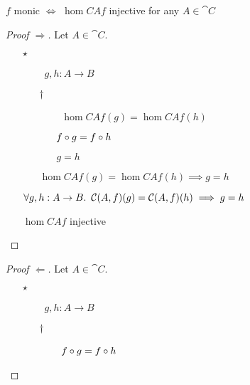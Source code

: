\begin{prop}
  $f$ monic $\iff$ $\hom{C}{A}{f}$ injective for any $A\in\cat{C}$

  \begin{proof}[Proof $\Rightarrow$]
    Let $A\in\cat{C}$.
    \begin{itemize}
      \item[$\star$]
        \begin{itemize}
          \item[\phs] \Let~$g, h : A\to B$
            \marginnote{\Hyp}

          \item[$\dagger$]
            \begin{itemize}
            \item[\phs] \Ass~$\hom{C}{A}{f}(g) = \hom{C}{A}{f}(h)$
              \marginnote{\Hyp}

            \item[\iffs] $f\compose g = f\compose h$
              \marginnote{\Def-\ref{def:co-hom}}

            \item[\imps] $g = h$
            \end{itemize}

          \item[\imps] $\hom{C}{A}{f}(g) = \hom{C}{A}{f}(h) \implies g = h$
            \marginnote{\imps-\Intro-$\dagger$}
        \end{itemize}
      \item[\imps] $\forall g, h : A \to B\ldotp~\hom{C}{A}{f}(g) = \hom{C}{A}{f}(h) \implies g = h$
        \marginnote{$\forall$-\Intro-$\star$}

      \item[\iffs] $\hom{C}{A}{f}$ injective
        \qedhere
    \end{itemize}
  \end{proof}

  \begin{proof}[Proof $\Leftarrow$]
    Let $A\in\cat{C}$.
    \begin{itemize}
      \item[$\star$]
        \begin{itemize}
          \item[\phs] \Let~$g, h : A\to B$
            \marginnote{\Hyp}

          \item[$\dagger$]
            \begin{itemize}
            \item[\phs] \Ass~$f\compose g = f\compose h$
              \marginnote{\Hyp}


\end{itemize}
\end{itemize}
\end{itemize}
\end{proof}
\end{prop}
